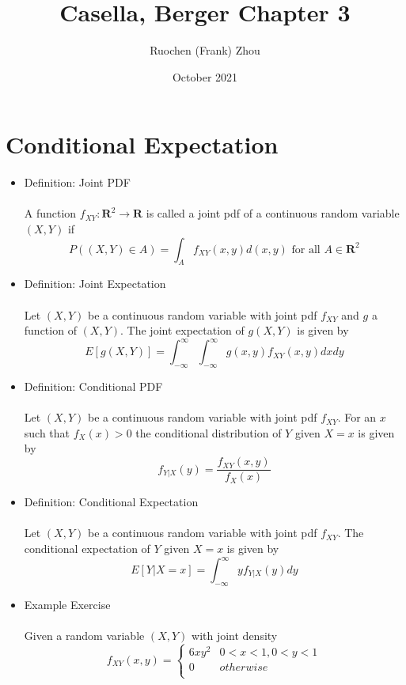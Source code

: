 \documentclass{article}
\title{Casella, Berger Chapter 3}
\author{Ruochen (Frank) Zhou }
\date{October 2021}
\begin{document}
\maketitle

\section{Conditional Expectation}
\begin{itemize}
    \item Definition: Joint PDF\\\\
    A function $f_{XY}:\mathbf{R}^2\rightarrow\mathbf{R}$ is called a joint pdf of a continuous random variable $(X,Y)$ if\\
    $$P((X,Y)\in A)=\int_Af_{XY}(x,y)d(x,y)\text{ for all }A\in\mathbf{R}^2$$
    \item Definition: Joint Expectation\\\\
    Let $(X,Y)$ be a continuous random variable with joint pdf $f_{XY}$ and $g$ a function of $(X,Y)$.  The joint expectation of $g(X,Y)$ is given by\\
    $$E[g(X,Y)]=\int_{-\infty}^\infty\int_{-\infty}^\infty g(x,y)f_{XY}(x,y)dxdy$$
    \item Definition: Conditional PDF\\\\
    Let $(X,Y)$ be a continuous random variable with joint pdf $f_{XY}$.  For an $x$ such that $f_X(x)>0$ the conditional distribution of $Y$ given $X=x$ is given by\\
    $$f_{Y|X}(y)=\dfrac{f_{XY}(x,y)}{f_X(x)}$$
    \item Definition: Conditional Expectation\\\\
    Let $(X,Y)$ be a continuous random variable with joint pdf $f_{XY}$.  The conditional expectation of $Y$ given $X=x$ is given by\\
    $$E[Y|X=x]=\int_{-\infty}^\infty yf_{Y|X}(y)dy$$
    \item Example Exercise\\\\
    Given a random variable $(X,Y)$ with joint density\\
        \begin{equation*}
            f_{XY}(x,y)=\begin{cases}
            6xy^2 & 0<x<1, 0<y<1\\
            0 & otherwise\\

\end{cases}
\end{equation*}
\end{itemize}
\end{document}
